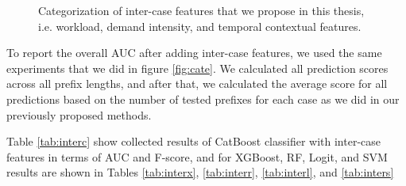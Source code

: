 \begin{figure}[!htb]
	\begin{center}
		\caption[Inter-case features]{Categorization of inter-case features that we propose in this thesis, i.e. workload, demand intensity, and temporal contextual features.
		}
		\label{fig:interr}
	\end{center}
\end{figure}




To report the overall AUC after adding inter-case features, we used the same experiments that we did in figure \ref{fig:cate}. We calculated all prediction scores across all prefix lengths, and after that, we calculated the average score for all predictions based on the number of tested prefixes for each case as we did in our previously proposed methods. 

Table \ref{tab:interc} show collected results of CatBoost classifier with inter-case features in terms of AUC and F-score, and for XGBoost, RF, Logit, and SVM results are shown in Tables \ref{tab:interx}, \ref{tab:interr}, \ref{tab:interl}, and \ref{tab:inters}


